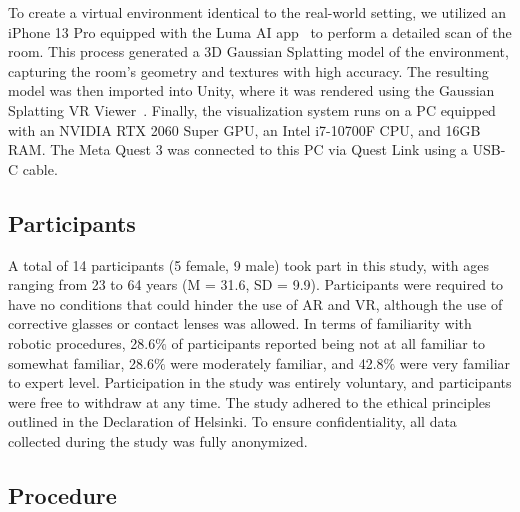 To create a virtual environment identical to the real-world setting, we utilized an iPhone 13 Pro equipped with the Luma AI app~\cite{lumaai} to perform a detailed scan of the room. This process generated a 3D Gaussian Splatting model of the environment, capturing the room’s geometry and textures with high accuracy. The resulting model was then imported into Unity, where it was rendered using the Gaussian Splatting VR Viewer~\cite{gaussianvr}. Finally, the visualization system runs on a PC equipped with an NVIDIA RTX 2060 Super GPU, an Intel i7-10700F CPU, and 16GB RAM. The Meta Quest 3 was connected to this PC via Quest Link using a USB-C cable.


\subsection{Participants}

A total of 14 participants (5 female, 9 male) took part in this study, with ages ranging from 23 to 64 years (M = 31.6, SD = 9.9). Participants were required to have no conditions that could hinder the use of AR and VR, although the use of corrective glasses or contact lenses was allowed.  In terms of familiarity with robotic procedures, 28.6$\%$ of participants reported being not at all familiar to somewhat familiar, 28.6$\%$ were moderately familiar, and 42.8$\%$ were very familiar to expert level.
Participation in the study was entirely voluntary, and participants were free to withdraw at any time. The study adhered to the ethical principles outlined in the Declaration of Helsinki. To ensure confidentiality, all data collected during the study was fully anonymized.

\subsection{Procedure}

